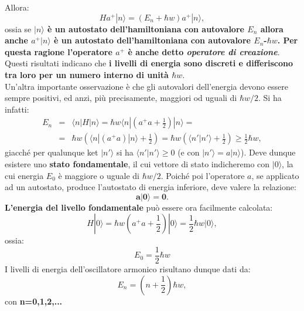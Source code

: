 Allora:
\begin{equation}
Ha^+|n\rangle=(E_n+\hbar w)a^+|n\rangle,
\end{equation}
ossia se \textbf{$|n\rangle$ è un autostato dell'hamiltoniana con autovalore $E_n$ allora anche $a^+|n\rangle$ è  un autostato dell'hamiltoniana con autovalore $E_n$-$\hbar w$. Per questa ragione l'operatore $a^+$ è anche detto \textit{operatore di creazione}}. \\ 
 Questi risultati indicano che \textbf{i livelli di energia sono discreti e differiscono tra loro per un numero interno di unità $\hbar w$}.\\
 Un'altra importante osservazione è che gli autovalori dell'energia devono essere sempre positivi, ed anzi, più precisamente, maggiori od uguali di $\hbar w/2$. Si ha infatti:
\begin{eqnarray}
	E_n&=&\langle n|H|n \rangle= \hbar w \langle n|(a^+a+\frac{1}{2})|n\rangle= \nonumber \\
	&=&\hbar w (\langle n|(a^+a)|n\rangle+\frac{1}{2})=\hbar w (\langle n'|n'\rangle+\frac{1}{2}) \geq \frac{1}{2} \hbar w, 
\end{eqnarray}
giacché per qualunque ket $|n'\rangle$ si ha $\langle n'|n' \rangle\geq 0$ (e con $|n'\rangle= a|n\rangle$).
Deve dunque esistere uno \textbf{stato fondamentale}, il cui vettore di stato indicheremo con $|0\rangle$, la cui energia $E_0$ è maggiore o uguale di $\hbar w/2$. Poiché poi l'operatore $a$, se applicato ad un autostato, produce l'autostato di energia inferiore, deve valere la relazione:
\begin{equation}  \label{eq:cap11_7}
\mathbf{a|0\rangle=0}.
\end{equation}
 \textbf{L'energia del livello fondamentale} può essere ora facilmente calcolata:
\begin{equation}
H|0\rangle= \hbar w(a^+a+\frac{1}{2})|0\rangle= \frac{1}{2} \hbar w |0\rangle,
\end{equation}
ossia:
\begin{equation}
E_0=\frac{1}{2} \hbar w
\end{equation}
 I livelli di energia dell'oscillatore armonico risultano dunque dati da:
\begin{equation}
  \label{eq:cap11_8}
E_n=(n+\frac{1}{2}) \hbar w ,
\end{equation}
con   \textbf{n=0,1,2,...}

